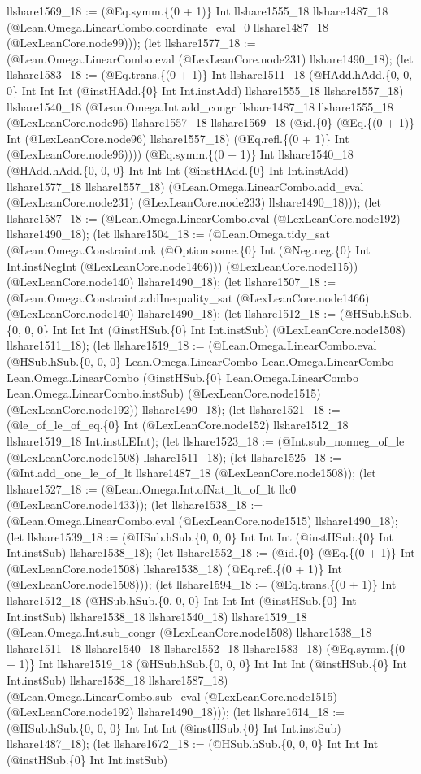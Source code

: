 \documentclass[11pt]{article}
\begin{document}
llshare1569\_18 := (@Eq.symm.\{(0 + 1)\} Int llshare1555\_18 llshare1487\_18 (@Lean.Omega.LinearCombo.coordinate\_eval\_0 llshare1487\_18 (@LexLeanCore.node99))); (let llshare1577\_18 := (@Lean.Omega.LinearCombo.eval (@LexLeanCore.node231) llshare1490\_18); (let llshare1583\_18 := (@Eq.trans.\{(0 + 1)\} Int llshare1511\_18 (@HAdd.hAdd.\{0, 0, 0\} Int Int Int (@instHAdd.\{0\} Int Int.instAdd) llshare1555\_18 llshare1557\_18) llshare1540\_18 (@Lean.Omega.Int.add\_congr llshare1487\_18 llshare1555\_18 (@LexLeanCore.node96) llshare1557\_18 llshare1569\_18 (@id.\{0\} (@Eq.\{(0 + 1)\} Int (@LexLeanCore.node96) llshare1557\_18) (@Eq.refl.\{(0 + 1)\} Int (@LexLeanCore.node96)))) (@Eq.symm.\{(0 + 1)\} Int llshare1540\_18 (@HAdd.hAdd.\{0, 0, 0\} Int Int Int (@instHAdd.\{0\} Int Int.instAdd) llshare1577\_18 llshare1557\_18) (@Lean.Omega.LinearCombo.add\_eval (@LexLeanCore.node231) (@LexLeanCore.node233) llshare1490\_18))); (let llshare1587\_18 := (@Lean.Omega.LinearCombo.eval (@LexLeanCore.node192) llshare1490\_18); (let llshare1504\_18 := (@Lean.Omega.tidy\_sat (@Lean.Omega.Constraint.mk (@Option.some.\{0\} Int (@Neg.neg.\{0\} Int Int.instNegInt (@LexLeanCore.node1466))) (@LexLeanCore.node115)) (@LexLeanCore.node140) llshare1490\_18); (let llshare1507\_18 := (@Lean.Omega.Constraint.addInequality\_sat (@LexLeanCore.node1466) (@LexLeanCore.node140) llshare1490\_18); (let llshare1512\_18 := (@HSub.hSub.\{0, 0, 0\} Int Int Int (@instHSub.\{0\} Int Int.instSub) (@LexLeanCore.node1508) llshare1511\_18); (let llshare1519\_18 := (@Lean.Omega.LinearCombo.eval (@HSub.hSub.\{0, 0, 0\} Lean.Omega.LinearCombo Lean.Omega.LinearCombo Lean.Omega.LinearCombo (@instHSub.\{0\} Lean.Omega.LinearCombo Lean.Omega.LinearCombo.instSub) (@LexLeanCore.node1515) (@LexLeanCore.node192)) llshare1490\_18); (let llshare1521\_18 := (@le\_of\_le\_of\_eq.\{0\} Int (@LexLeanCore.node152) llshare1512\_18 llshare1519\_18 Int.instLEInt); (let llshare1523\_18 := (@Int.sub\_nonneg\_of\_le (@LexLeanCore.node1508) llshare1511\_18); (let llshare1525\_18 := (@Int.add\_one\_le\_of\_lt llshare1487\_18 (@LexLeanCore.node1508)); (let llshare1527\_18 := (@Lean.Omega.Int.ofNat\_lt\_of\_lt llc0 (@LexLeanCore.node1433)); (let llshare1538\_18 := (@Lean.Omega.LinearCombo.eval (@LexLeanCore.node1515) llshare1490\_18); (let llshare1539\_18 := (@HSub.hSub.\{0, 0, 0\} Int Int Int (@instHSub.\{0\} Int Int.instSub) llshare1538\_18); (let llshare1552\_18 := (@id.\{0\} (@Eq.\{(0 + 1)\} Int (@LexLeanCore.node1508) llshare1538\_18) (@Eq.refl.\{(0 + 1)\} Int (@LexLeanCore.node1508))); (let llshare1594\_18 := (@Eq.trans.\{(0 + 1)\} Int llshare1512\_18 (@HSub.hSub.\{0, 0, 0\} Int Int Int (@instHSub.\{0\} Int Int.instSub) llshare1538\_18 llshare1540\_18) llshare1519\_18 (@Lean.Omega.Int.sub\_congr (@LexLeanCore.node1508) llshare1538\_18 llshare1511\_18 llshare1540\_18 llshare1552\_18 llshare1583\_18) (@Eq.symm.\{(0 + 1)\} Int llshare1519\_18 (@HSub.hSub.\{0, 0, 0\} Int Int Int (@instHSub.\{0\} Int Int.instSub) llshare1538\_18 llshare1587\_18) (@Lean.Omega.LinearCombo.sub\_eval (@LexLeanCore.node1515) (@LexLeanCore.node192) llshare1490\_18))); (let llshare1614\_18 := (@HSub.hSub.\{0, 0, 0\} Int Int Int (@instHSub.\{0\} Int Int.instSub) llshare1487\_18); (let llshare1672\_18 := (@HSub.hSub.\{0, 0, 0\} Int Int Int (@instHSub.\{0\} Int Int.instSub) 
\end{document}
